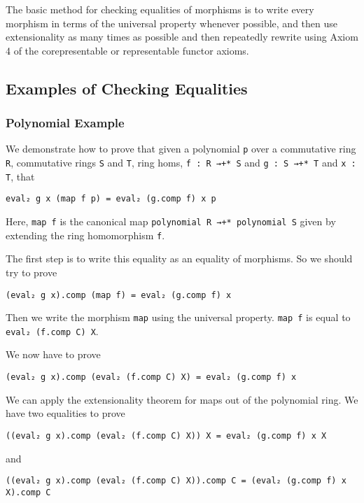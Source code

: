 \documentclass[12pt]{article} %
\theoremstyle{definition}
\theoremstyle{definition}
\theoremstyle{definition}
\theoremstyle{definition}
\begin{document}
The basic method for checking equalities of morphisms is to write every morphism in terms of
the universal property whenever possible, and then use extensionality as many times
as possible and then repeatedly
rewrite using Axiom 4 of the corepresentable or representable functor axioms.

\subsection{Examples of Checking Equalities}

\subsubsection{Polynomial Example}
We demonstrate how to prove that given a polynomial
\lstinline{p} over a commutative ring \lstinline{R}, commutative rings
\lstinline{S} and \lstinline{T}, ring homs,
\lstinline{f : R →+* S} and \lstinline{g : S →+* T} and \lstinline{x : T},
that
\begin{lstlisting}
eval₂ g x (map f p) = eval₂ (g.comp f) x p
\end{lstlisting}

Here, \lstinline{map f} is the canonical map \lstinline{polynomial R →+* polynomial S}
given by extending the ring homomorphism \lstinline{f}.

The first step is to write this equality as an equality of morphisms. So we should try to prove
\begin{lstlisting}
(eval₂ g x).comp (map f) = eval₂ (g.comp f) x
\end{lstlisting}

Then we write the morphism \lstinline{map} using the universal property.
\lstinline{map f} is equal to \lstinline {eval₂ (f.comp C) X}.

We now have to prove
\begin{lstlisting}
(eval₂ g x).comp (eval₂ (f.comp C) X) = eval₂ (g.comp f) x
\end{lstlisting}

We can apply the extensionality theorem for maps out of the polynomial ring.
We have two equalities to prove
\begin{lstlisting}
((eval₂ g x).comp (eval₂ (f.comp C) X)) X = eval₂ (g.comp f) x X
\end{lstlisting}
and
\begin{lstlisting}
((eval₂ g x).comp (eval₂ (f.comp C) X)).comp C = (eval₂ (g.comp f) x X).comp C
\end{lstlisting}
\end{document}
